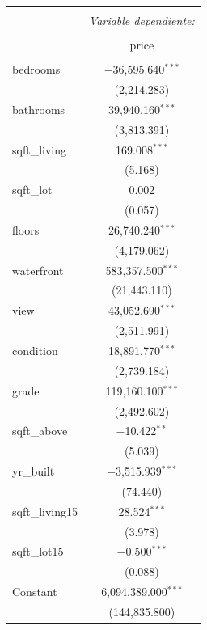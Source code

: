 \documentclass[10pt,letterpaper]{article}
\begin{document}
\begin{table}[!htbp] \centering 
	\small
	\begin{tabular}{@{\extracolsep{0pt}}lc} 
		\\[-1.8ex]\hline 
		\hline \\[-1.8ex] 
		& \multicolumn{1}{c}{\textit{Variable dependiente:}} \\ 
		\cline{2-2} 
		\\[-1.8ex] & price \\ 
		\hline \\[-1.8ex] 
		
		bedrooms & $-$36,595.640$^{***}$ \\ & (2,214.283) \\ \hline
		bathrooms & 39,940.160$^{***}$ \\ 
		& (3,813.391) \\ 
		\hline 
		sqft\_living & 169.008$^{***}$ \\ 
		& (5.168) \\ 
		\hline
		sqft\_lot & 0.002 \\ 
		& (0.057) \\ 
		\hline
		floors & 26,740.240$^{***}$ \\ 
		& (4,179.062) \\ 
		\hline
		waterfront & 583,357.500$^{***}$ \\ 
		& (21,443.110) \\ 
		\hline
		view & 43,052.690$^{***}$ \\ 
		& (2,511.991) \\ 
		\hline
		condition & 18,891.770$^{***}$ \\ 
		& (2,739.184) \\ 
		\hline
		grade & 119,160.100$^{***}$ \\ 
		& (2,492.602) \\ 
		\hline
		sqft\_above & $-$10.422$^{**}$ \\ 
		& (5.039) \\ 
		\hline
		yr\_built & $-$3,515.939$^{***}$ \\ 
		& (74.440) \\ 
		\hline
		sqft\_living15 & 28.524$^{***}$ \\ 
		& (3.978) \\ 
		\hline
		sqft\_lot15 & $-$0.500$^{***}$ \\ 
		& (0.088) \\ 
		\hline
		Constant & 6,094,389.000$^{***}$ \\ 
		& (144,835.800) \\ 

\end{tabular}
\end{table}
\end{document}
